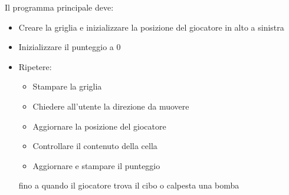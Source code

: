 \documentclass[a4paper,12pt]{article}
\begin{document}
	Il programma principale deve:
	\begin{itemize}
		\item Creare la griglia e inizializzare la posizione del giocatore in alto a sinistra
		\item Inizializzare il punteggio a 0
		\item Ripetere:
		\begin{itemize}
			\item Stampare la griglia
			\item Chiedere all'utente la direzione da muovere
			\item Aggiornare la posizione del giocatore
			\item Controllare il contenuto della cella
			\item Aggiornare e stampare il punteggio
		\end{itemize}
		fino a quando il giocatore trova il cibo o calpesta una bomba
	\end{itemize}
	
	
\end{document}
